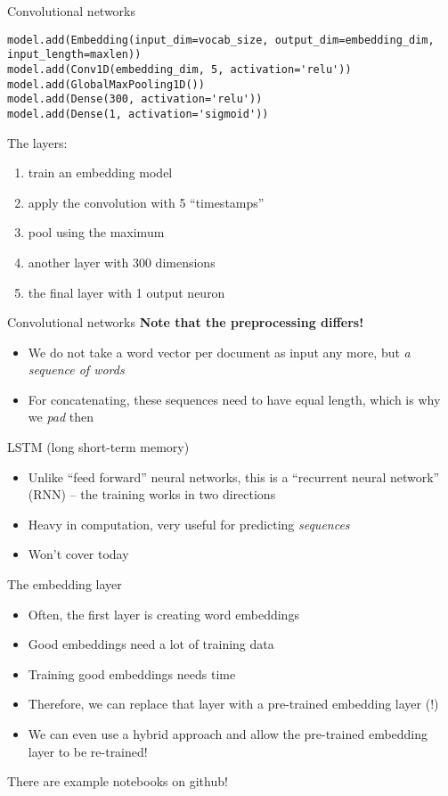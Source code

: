 \begin{frame}[fragile]{Convolutional networks}
\begin{lstlisting}
model.add(Embedding(input_dim=vocab_size, output_dim=embedding_dim, input_length=maxlen))
model.add(Conv1D(embedding_dim, 5, activation='relu'))
model.add(GlobalMaxPooling1D())
model.add(Dense(300, activation='relu'))
model.add(Dense(1, activation='sigmoid'))
\end{lstlisting}	
The layers:	
\begin{enumerate}[<+->]
\item train an embedding model
\item apply the convolution with 5 ``timestamps''
\item pool using the maximum
\item another layer with 300 dimensions
\item the final layer with 1 output neuron
\end{enumerate}
\end{frame}


\begin{frame}{Convolutional networks}
  \textbf{Note that the preprocessing differs!}
  
  \begin{itemize}
  \item We do not take a word vector per document as input any more, but \emph{a sequence of words}
  \item For concatenating, these sequences need to have equal length, which is why we \emph{pad} then
  \end{itemize}
	
\end{frame}




\begin{frame}{LSTM (long short-term memory)}
  \begin{itemize}
  \item Unlike ``feed forward'' neural networks, this is  a ``recurrent neural network'' (RNN) -- the training works in two directions
  \item Heavy in computation, very useful for predicting \emph{sequences}
  \item Won't cover today
  \end{itemize}
\end{frame}




\begin{frame}{The embedding layer}
  \begin{itemize}
  \item Often, the first layer is creating word embeddings
  \item Good embeddings need a lot of training data
  \item Training good embeddings needs time
  \item Therefore, we can replace that layer with a pre-trained embedding layer (!)
  \item We can even use a hybrid approach and allow the pre-trained embedding layer to be re-trained!
  \end{itemize}
\end{frame}



\begin{frame}[standout]
  There are example notebooks on github!
\end{frame}
